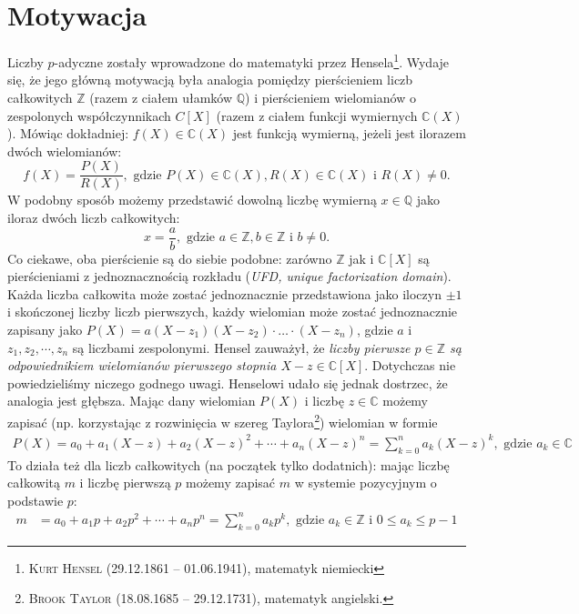 \documentclass[a4paper,fleqn,9pt]{extarticle}
\begin{document}
\section{Motywacja}
Liczby $p$-adyczne zostały wprowadzone do matematyki przez Hensela\footnote{\textsc{Kurt Hensel} (29.12.1861 -- 01.06.1941), matematyk niemiecki}. Wydaje się, że jego główną motywacją była analogia pomiędzy pierścieniem liczb całkowitych $\mathbb Z$ (razem z ciałem ułamków $\mathbb Q$) i pierścieniem wielomianów o zespolonych współczynnikach $C[X]$ (razem z ciałem funkcji wymiernych $\mathbb C(X)$). Mówiąc dokładniej: $f(X) \in \mathbb C(X)$ jest funkcją wymierną, jeżeli jest ilorazem dwóch wielomianów: 
\begin{equation*}f(X) = \frac{P(X)}{R(X)}, \text{ gdzie } P(X)\in \mathbb C(X), R(X)\in \mathbb C(X) \text { i } R(X) \neq 0.\end{equation*}
W podobny sposób możemy przedstawić dowolną liczbę wymierną $x \in \mathbb Q$ jako iloraz dwóch liczb całkowitych:
\begin{equation*}x = \frac{a}{b}, \text{ gdzie } a\in \mathbb Z, b \in \mathbb Z \text { i } b \neq 0.\end{equation*}
Co ciekawe, oba pierścienie są do siebie podobne: zarówno $\mathbb Z$ jak i $\mathbb C[X]$ są pierścieniami z jednoznacznością rozkładu (\emph{UFD, unique factorization domain}). Każda liczba całkowita może zostać jednoznacznie przedstawiona jako iloczyn $\pm 1$ i skończonej liczby liczb pierwszych, każdy wielomian może zostać jednoznacznie zapisany jako $P(X) = a(X - z_1)(X - z_2)\cdot\ldots\cdot(X - z_n)$, gdzie $a$ i $z_1, z_2, \cdots, z_n$ są liczbami zespolonymi. Hensel zauważył, że \emph{liczby pierwsze $p\in\mathbb Z$ są odpowiednikiem wielomianów pierwszego stopnia $X - z \in \mathbb C[X]$}. Dotychczas nie powiedzieliśmy niczego godnego uwagi. Henselowi udało się jednak dostrzec, że analogia jest głębsza. Mając dany wielomian $P(X)$ i liczbę $z \in \mathbb C$ możemy zapisać (np. korzystając z rozwinięcia w szereg Taylora\footnote{\textsc{Brook Taylor} (18.08.1685 -- 29.12.1731), matematyk angielski.}) wielomian w formie
\begin{align*}
P(X) = a_0 + a_1(X-z) + a_2(X-z)^2 + \cdots + a_n(X-z)^n = \sum_{k=0}^n a_k(X-z)^k, \text{ gdzie } a_k \in\mathbb C
\end{align*}
To działa też dla liczb całkowitych (na początek tylko dodatnich): mając liczbę całkowitą $m$ i liczbę pierwszą $p$ możemy zapisać $m$ w systemie pozycyjnym o podstawie $p$:
\begin{align*}
m & = a_0 + a_1p+ a_2p^2 + \cdots + a_np^n = \sum_{k=0}^n a_kp^k, \text{ gdzie } a_k \in\mathbb Z \text{ i } 0 \le a_k \le p-1
\end{align*}
\end{document}
